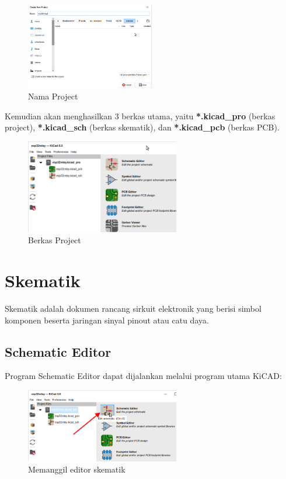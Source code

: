 \documentclass[12pt]{book}
\begin{document}
	\begin{figure}[!ht]
		\centering
		\includegraphics[width=0.5\textwidth]{images/main/kicad_new_1}
		\caption{Nama Project}
	\end{figure}

	Kemudian akan menghasilkan 3 berkas utama, yaitu \textbf{*.kicad\_pro} (berkas project),
	\textbf{*.kicad\_sch} (berkas skematik), dan \textbf{*.kicad\_pcb} (berkas PCB).

	\begin{figure}[!ht]
		\centering
		\includegraphics[width=0.6\textwidth]{images/main/kicad_new_2}
		\caption{Berkas Project}
	\end{figure}


	\newpage
	\chapter{Skematik}
	Skematik adalah dokumen rancang sirkuit elektronik yang berisi simbol komponen beserta jaringan sinyal pinout atau catu daya.

	\section{Schematic Editor}

	Program Schematic Editor dapat dijalankan melalui program utama KiCAD:

	\begin{figure}[!ht]
		\centering
		\includegraphics[width=0.6\textwidth]{images/sch/sch_0}
		\caption{Memanggil editor skematik}
	\end{figure}
\end{document}
